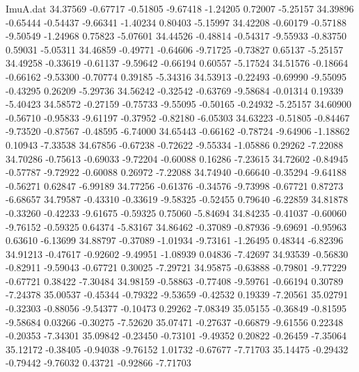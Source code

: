\begin{filecontents}{ImuA.dat}
  34.37569   -0.67717   -0.51805   -9.67418   -1.24205    0.72007   -5.25157
  34.39896   -0.65444   -0.54437   -9.66341   -1.40234    0.80403   -5.15997
  34.42208   -0.60179   -0.57188   -9.50549   -1.24968    0.75823   -5.07601
  34.44526   -0.48814   -0.54317   -9.55933   -0.83750    0.59031   -5.05311
  34.46859   -0.49771   -0.64606   -9.71725   -0.73827    0.65137   -5.25157
  34.49258   -0.33619   -0.61137   -9.59642   -0.66194    0.60557   -5.17524
  34.51576   -0.18664   -0.66162   -9.53300   -0.70774    0.39185   -5.34316
  34.53913   -0.22493   -0.69990   -9.55095   -0.43295    0.26209   -5.29736
  34.56242   -0.32542   -0.63769   -9.58684   -0.01314    0.19339   -5.40423
  34.58572   -0.27159   -0.75733   -9.55095   -0.50165   -0.24932   -5.25157
  34.60900   -0.56710   -0.95833   -9.61197   -0.37952   -0.82180   -6.05303
  34.63223   -0.51805   -0.84467   -9.73520   -0.87567   -0.48595   -6.74000
  34.65443   -0.66162   -0.78724   -9.64906   -1.18862    0.10943   -7.33538
  34.67856   -0.67238   -0.72622   -9.55334   -1.05886    0.29262   -7.22088
  34.70286   -0.75613   -0.69033   -9.72204   -0.60088    0.16286   -7.23615
  34.72602   -0.84945   -0.57787   -9.72922   -0.60088    0.26972   -7.22088
  34.74940   -0.66640   -0.35294   -9.64188   -0.56271    0.62847   -6.99189
  34.77256   -0.61376   -0.34576   -9.73998   -0.67721    0.87273   -6.68657
  34.79587   -0.43310   -0.33619   -9.58325   -0.52455    0.79640   -6.22859
  34.81878   -0.33260   -0.42233   -9.61675   -0.59325    0.75060   -5.84694
  34.84235   -0.41037   -0.60060   -9.76152   -0.59325    0.64374   -5.83167
  34.86462   -0.37089   -0.87936   -9.69691   -0.95963    0.63610   -6.13699
  34.88797   -0.37089   -1.01934   -9.73161   -1.26495    0.48344   -6.82396
  34.91213   -0.47617   -0.92602   -9.49951   -1.08939    0.04836   -7.42697
  34.93539   -0.56830   -0.82911   -9.59043   -0.67721    0.30025   -7.29721
  34.95875   -0.63888   -0.79801   -9.77229   -0.67721    0.38422   -7.30484
  34.98159   -0.58863   -0.77408   -9.59761   -0.66194    0.30789   -7.24378
  35.00537   -0.45344   -0.79322   -9.53659   -0.42532    0.19339   -7.20561
  35.02791   -0.32303   -0.88056   -9.54377   -0.10473    0.29262   -7.08349
  35.05155   -0.36849   -0.81595   -9.58684    0.03266   -0.30275   -7.52620
  35.07471   -0.27637   -0.66879   -9.61556    0.22348   -0.20353   -7.34301
  35.09842   -0.23450   -0.73101   -9.49352    0.20822   -0.26459   -7.35064
  35.12172   -0.38405   -0.94038   -9.76152    1.01732   -0.67677   -7.71703
  35.14475   -0.29432   -0.79442   -9.76032    0.43721   -0.92866   -7.71703

\end{filecontents}
